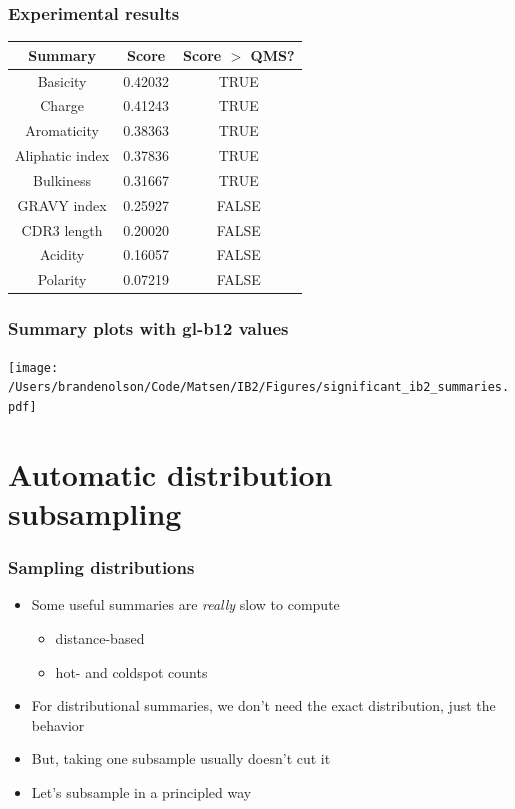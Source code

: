 \documentclass[mathserif,compress]{beamer}
\renewcommand\;{\,}
\begin{document}
\begin{frame}\frametitle{Experimental results}
\begin{center}
\begin{tabular}{c|c|c}
Summary & Score & Score $>$ QMS? \\
\hline
Basicity & 0.42032 & TRUE \\
Charge & 0.41243 & TRUE \\
Aromaticity & 0.38363 & TRUE \\
Aliphatic index & 0.37836 & TRUE \\
Bulkiness & 0.31667 & TRUE \\
GRAVY index & 0.25927 & FALSE \\
CDR3 length & 0.20020 & FALSE \\
Acidity & 0.16057 & FALSE \\
Polarity & 0.07219 & FALSE \\
\end{tabular}
\end{center}
\end{frame}

\begin{frame}\frametitle{Summary plots with gl-b12 values}
\begin{center}
\texttt{[image: /Users/brandenolson/Code/Matsen/IB2/Figures/significant\_ib2\_summaries.pdf]}
\end{center}
\end{frame}

\section{Automatic distribution subsampling}

\begin{frame}\frametitle{Sampling distributions}
\begin{itemize}
\item Some useful summaries are \emph{really} slow to compute
\begin{itemize}
\item distance-based
\medskip
\item hot- and coldspot counts
\end{itemize}
\bigskip
\item For distributional summaries, we don't need the exact distribution, just the behavior
\bigskip
\item
But, taking one subsample usually doesn't cut it
\bigskip
\item Let's subsample in a principled way
\end{itemize}
\end{frame}
\end{document}
